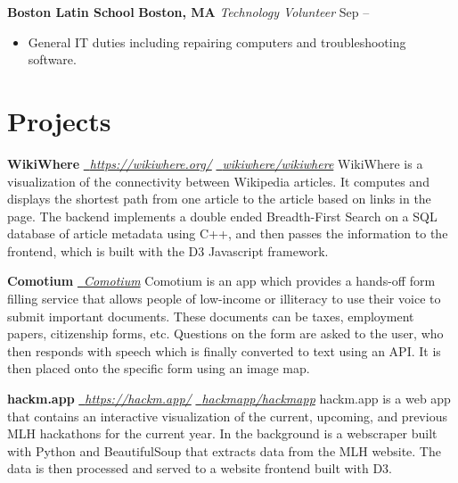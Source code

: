 \documentclass[10pt]{article}
\newcommand{\textlbf}[1]{{\roboto #1}}
\renewcommand{\date}[2]{#1 \textlbf{#2}}
\newcommand{\daterange}[2]{#1 -- \ifthenelse{\equal{#2}{}}{\textit{Present}}{#2}}
\newcommand{\resumesection}[1]{\vspace{-0.2cm}\section*{#1}\vspace{-0.2cm}\vspace{0.1cm}}
\begin{document}
\begin{minipage}[t]{0.7\textwidth}
\begin{flushleft}
  \vspace{0.25cm}

  \textbf{Boston Latin School} \hfill \textbf{Boston, MA} \newline
  \textit{Technology Volunteer} \hfill \daterange{\date{Sep}{2017}}{}
  \begin{itemize}
    \item General IT duties including repairing computers and troubleshooting software.
  \end{itemize}
  
  \resumesection{Projects}
  
  \textbf{WikiWhere} \hfill \href{https://wikiwhere.org/}{\faLink \, \textit{https://wikiwhere.org/}} \quad \href{https://github.com/wikiwhere/wikiwhere}{\faGithub \, \textit{wikiwhere/wikiwhere}} \newline
  WikiWhere is a visualization of the connectivity between Wikipedia articles. It computes and displays the shortest path from one article to the article based on links in the page. The backend implements a double ended Breadth-First Search on a SQL database of article metadata using C++, and then passes the information to the frontend, which is built with the D3 Javascript framework.

  \vspace{0.25cm}

  \textbf{Comotium} \hfill \href{https://github.com/comotium}{\faGithub \, \textit{Comotium}} \newline
  Comotium is an app which provides a hands-off form filling service that allows people of low-income or illiteracy to use their voice to submit important documents. These documents can be taxes, employment papers, citizenship forms, etc. Questions on the form are asked to the user, who then responds with speech which is finally converted to text using an API. It is then placed onto the specific form using an image map.

  \vspace{0.25cm}

  \textbf{hackm.app} \hfill \href{https://hackm.app/}{\faLink \, \textit{https://hackm.app/}} \quad \href{https://github.com/hackmapp/hackmapp}{\faGithub \, \textit{hackmapp/hackmapp}} \newline
  hackm.app is a web app that contains an interactive visualization of the current, upcoming, and previous MLH hackathons for the current year. In the background is a webscraper built with Python and BeautifulSoup that extracts data from the MLH website. The data is then processed and served to a website frontend built with D3.



  \end{flushleft}
\end{minipage}
\end{document}
